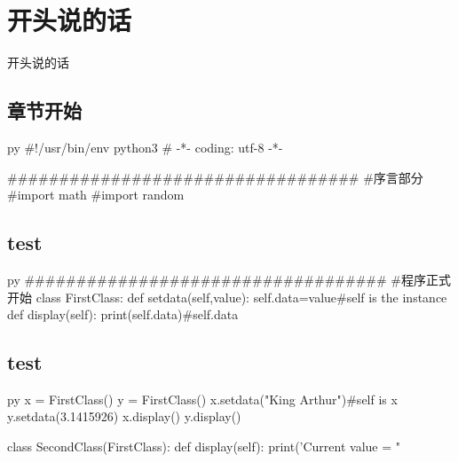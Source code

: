 \documentclass[11pt,oneside]{book}
\begin{document}
\frontmatter

\author{作者}
\titleLC

\chapter*{开头说的话}
\begin{common-format}
开头说的话


\end{common-format}


\setcounter{tocdepth}{2}
\tableofcontents

\begin{common-format}
\mainmatter

\chapter{章节开始}

\begin{cverbatim}{py}
#!/usr/bin/env python3
# -*- coding: utf-8 -*-

##################################
#序言部分
#import math
#import random
\end{cverbatim}

\section{test}
\begin{cverbatim}{py}
###################################
#程序正式开始
class FirstClass:
    def setdata(self,value):
        self.data=value#self is the instance
    def display(self):
        print(self.data)#self.data
\end{cverbatim}



\section{test}
\begin{cverbatim}{py}
x = FirstClass()
y = FirstClass()
x.setdata("King Arthur")#self is x
y.setdata(3.1415926)
x.display()
y.display()

class SecondClass(FirstClass):
    def display(self):
        print('Current value = "%


\end{cverbatim}
\end{common-format}
\end{document}
